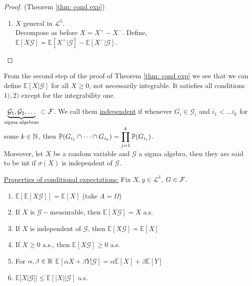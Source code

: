 \documentclass{article}
\begin{document}
\begin{proof}{(Theorem \ref{thm: cond exp})}
\begin{enumerate}
\item $ X$ general in $\mathcal{L}^{1}$.\\ 
	Decompose as before $ X = X^{+}-X^{-}$. Define, $\mathbb{E}[X\mathcal{G}] =\mathbb{E}[X^{+}|\mathcal{G}]-\mathbb{E}[X^{-}|\mathcal{G}]$.
\end{enumerate}

\end{proof}

\begin{remark}
From the second step of the proof of Theorem \ref{thm: cond exp} we see that we can define $\mathbb{E}[X|\mathcal{G}]$ for all $ X\geq 0$, not necessarily integrable. It satisfies all conditions $ 1) , 2)$ except for the integrability one.
\end{remark}

\begin{boxdef}\label{def: independence of sigma algebras}
$\underbrace{\mathcal{G}_{1},\mathcal{G}_{2}, \dots}_{\text{sigma algebras}} \subset \mathcal{F}$. We call them \underline{independent} if whenever $ G_{i}\in \mathcal{G}_{i}$ and $ i_{1}<\dots i_{k}$ for some $ k \in \mathbb{N}$, then $ \mathbb{P}(G_{i_{1}}\cap \dots\cap G_{i_{k}}) = \displaystyle \prod^{k}_{j=1}\mathbb{P}(G_{i_{j}})$.\\ 

Moreover, let $ X$ be a random variable and $\mathcal{G}$ a sigma algebra, then they are said to be int if $ \sigma(X)$ is independent of $\mathcal{G}$.
\end{boxdef}

\underline{Properties of conditional expectations:}
Fix $ X,y \in\mathcal{L}^{1}$, $ G\in \mathcal{F}$.
\begin{enumerate}
	\item $\mathbb{E}[\mathbb{E}[X\mathcal{G}]]=\mathbb{E}[X]$ (take $ A  = \Omega$)
	\item If $ X$ is $\mathcal{G}-$measurable, then $\mathbb{E}[X\mathcal{G}]=X$ a.s.
	\item If $ X$ is independent of $\mathcal{G}$, then $\mathbb{E}[X\mathcal{G}]=\mathbb{E}[X]$
	\item If $ X\geq 0$ a.s., then $\mathbb{E}[X\mathcal{G}]\geq 0 $ a.s. 
	\item For $ \alpha, \beta \in \mathbb{R}$ $\mathbb{E}[\alpha X + \beta Y |\mathcal{G}] = \alpha\mathbb{E}[X]+\beta\mathbb{E}[Y]$
	\item $\mathbb{E}[X|\mathcal{G}]|\leq\mathbb{E}[|X| |\mathcal{G}]$ a.s. 
\end{enumerate}
\end{document}
